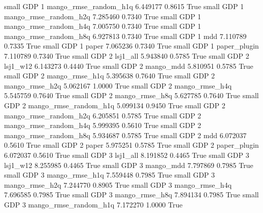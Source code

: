      small      GDP                 1 mango_rmse_random_h1q   6.449177      0.8615    True
     small      GDP                 1 mango_rmse_random_h2q   7.285460      0.7340    True
     small      GDP                 1 mango_rmse_random_h4q   7.005750      0.7340    True
     small      GDP                 1 mango_rmse_random_h8q   6.927813      0.7340    True
     small      GDP                 1                   mdd   7.110789      0.7335    True
     small      GDP                 1                 paper   7.065236      0.7340    True
     small      GDP                 1          paper_plugin   7.110789      0.7340    True
     small      GDP                 2              lsj1_all   5.943840      0.5785    True
     small      GDP                 2              lsj1_w12   6.143273      0.4440    True
     small      GDP                 2             mango_mdd   5.810951      0.5785    True
     small      GDP                 2        mango_rmse_h1q   5.395638      0.7640    True
     small      GDP                 2        mango_rmse_h2q   5.062167      1.0000    True
     small      GDP                 2        mango_rmse_h4q   5.545759      0.7640    True
     small      GDP                 2        mango_rmse_h8q   5.627785      0.7640    True
     small      GDP                 2 mango_rmse_random_h1q   5.099134      0.9450    True
     small      GDP                 2 mango_rmse_random_h2q   6.205851      0.5785    True
     small      GDP                 2 mango_rmse_random_h4q   5.999395      0.5610    True
     small      GDP                 2 mango_rmse_random_h8q   5.934687      0.5785    True
     small      GDP                 2                   mdd   6.072037      0.5610    True
     small      GDP                 2                 paper   5.975251      0.5785    True
     small      GDP                 2          paper_plugin   6.072037      0.5610    True
     small      GDP                 3              lsj1_all   8.191852      0.4465    True
     small      GDP                 3              lsj1_w12   8.255985      0.4465    True
     small      GDP                 3             mango_mdd   7.797869      0.7985    True
     small      GDP                 3        mango_rmse_h1q   7.559448      0.7985    True
     small      GDP                 3        mango_rmse_h2q   7.244770      0.8905    True
     small      GDP                 3        mango_rmse_h4q   7.696585      0.7985    True
     small      GDP                 3        mango_rmse_h8q   7.894134      0.7985    True
     small      GDP                 3 mango_rmse_random_h1q   7.172270      1.0000    True
